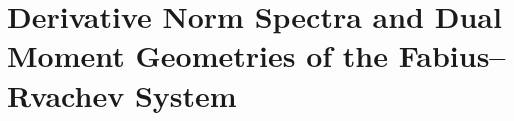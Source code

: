 \documentclass[11pt,oneside]{article}
\theoremstyle{definition}
\theoremstyle{remark}
\begin{document}
\newcommand{\Prob}{\mathbb P}
\newcommand{\dist}{\operatorname{dist}}
\newcommand{\Dop}{\mathscr D}
\newcommand{\Mop}{\mathscr M}
\newcommand{\Bop}{\mathscr B}
\newcommand{\qpoch}[2]{(#1;#2)_\infty}
\newcommand{\qpochfin}[3]{(#1;#2)_{#3}}
\newcommand{\abs}[1]{\left|#1\right|}
\newcommand{\norm}[1]{\left\lVert#1\right\rVert}
\newcommand{\set}[1]{\left\{#1\right\}}
\newcommand{\RepoCommit}{\nolinkurl{0341bbf91cb867f4510bc8431cf59878208de771}}
\newcommand{\RepoRoot}{\url{https://github.com/VladimirReshetnikov/ProveIt/tree/0341bbf91cb867f4510bc8431cf59878208de771/Analysis/FabiusFunction/docs}}
\newenvironment{conjecturebox}[1]{%
  \par\medskip\noindent\begin{minipage}{\textwidth}%
  \color{DeepRed}\hrule\vspace{5pt}%
  \color{black}\textbf{\color{DeepRed}#1.}\ }{%
  \par\vspace{5pt}\color{DeepRed}\hrule
  \end{minipage}\par\medskip}

\setcounter{section}{0}
\renewcommand{\thesection}{\arabic{section}}
\part{Derivative Norm Spectra and Dual Moment Geometries of the Fabius--Rvachev System}
\end{document}
